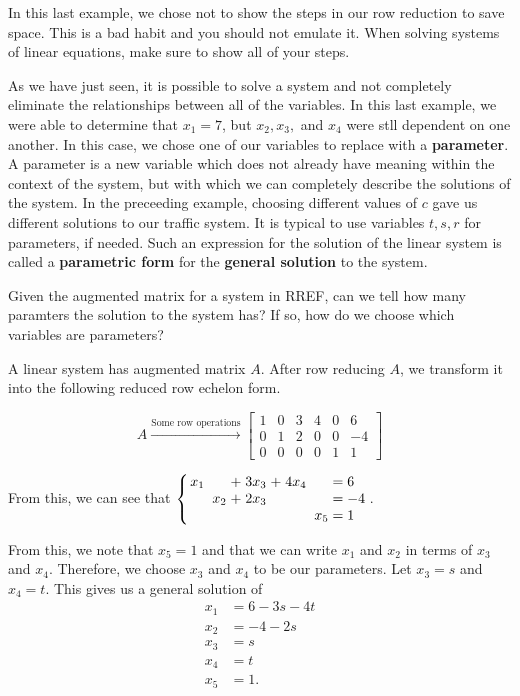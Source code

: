\begin{remark}
	In this last example, we chose not to show the steps in our row reduction to save space. This is a bad habit and you should not emulate it. When solving systems of linear equations, make sure to show all of your steps.
\end{remark}

As we have just seen, it is possible to solve a system and not completely eliminate the relationships between all of the variables. In this last example, we were able to determine that $x_1 = 7$, but $x_2, x_3,$ and $x_4$ were stll dependent on one another. In this case, we chose one of our variables to replace with a \textbf{parameter}. A parameter is a new variable which does not already have meaning within the context of the system, but with which we can completely describe the solutions of the system. In the preceeding example, choosing different values of $c$ gave us different solutions to our traffic system. It is typical to use variables $t, s, r$ for parameters, if needed. Such an expression for the solution of the linear system is called a \textbf{parametric form} for the \textbf{general solution} to the system.

Given the augmented matrix for a system in RREF, can we tell how many paramters the solution to the system has? If so, how do we choose which variables are parameters?

\begin{example}\label{ex:parameters}
	A linear system has augmented matrix $A$. After row reducing $A$, we transform it into the following reduced row echelon form.
	
	\[
		A \xrightarrow{\text{Some row operations}} 
		\begin{bmatrix} 
			1 & 0 & 3 & 4 & 0 & 6\\
			0 & 1 & 2 & 0 & 0 & -4\\
			0 & 0 & 0 & 0 & 1 & 1
		\end{bmatrix}
	\]
	
	From this, we can see that $\left\{ 
		\arraycolsep=1.4pt
		\begin{array}{rcrcrcrcrl} 
			x_1 & & & + &  3x_3 & + & 4x_4 & & & = 6\\
			      & & x_2 & + & 2x_3 & & & & & = -4\\
			      & & & & & & & & x_5 & = 1
		\end{array}
	\right.$.

	From this, we note that $x_5 = 1$ and that we can write $x_1$ and $x_2$ in terms of $x_3$ and $x_4$. Therefore, we choose $x_3$ and $x_4$ to be our parameters. Let $x_3 = s$ and $x_4 = t$. This gives us a general solution of
	\begin{align*}
		x_1 & = 6 - 3s - 4t\\
		x_2 &= -4 - 2s\\
		x_3 &= s \\
		x_4 &= t\\
		x_5 &= 1.
	\end{align*}
\end{example}

